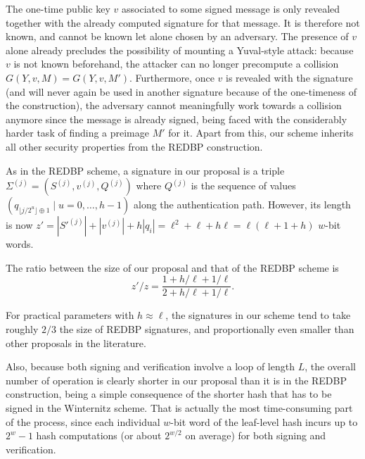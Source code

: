 \documentclass[11pt]{llncs}
\begin{document}
The one-time public key $v$ associated to some signed message is only revealed together with the already computed signature for that message. It is therefore not known, and cannot be known let alone chosen by an adversary.
The presence of $v$ alone already precludes the possibility of mounting a Yuval-style attack: because $v$ is not known beforehand, the attacker can no longer precompute a collision $G(Y, v, M) = G(Y, v, M')$. Furthermore, once $v$ is revealed with the signature (and will never again be used in another signature because of the one-timeness of the construction), the adversary cannot meaningfully work towards a collision anymore since the message is already signed, being faced with the considerably harder task of finding a preimage $M'$ for it. Apart from this, our scheme inherits all other security properties from the REDBP construction.

As in the REDBP scheme, a signature in our proposal is a triple $\Sigma^{(j)} = (S^{(j)}, v^{(j)}, Q^{(j)})$ where $Q^{(j)}$ is the sequence of values $(q_{\lfloor j/2^u \rfloor \oplus 1} \mid u = 0, \dots, h-1)$ along the authentication path. However, its length is now $z' = |S'^{(j)}| + |v^{(j)}| + h |q_i| = \ell^2 + \ell + h\ell = \ell(\ell + 1 + h)$ $w$-bit words.

The ratio between the size of our proposal and that of the REDBP scheme is
\[
z'/z = \dfrac{1 + h/\ell + 1/\ell}{2 + h/\ell + 1/\ell}.
\]

For practical parameters with $h \approx \ell$, the signatures in our scheme tend to take roughly $2/3$ the size of REDBP signatures, and proportionally even smaller than other proposals in the literature.

Also, because both signing and verification involve a loop of length $L$, the overall number of operation is clearly shorter in our proposal than it is in the REDBP construction, being a simple consequence of the shorter hash that has to be signed in the Winternitz scheme. That is actually the most time-consuming part of the process, since each individual $w$-bit word of the leaf-level hash incurs up to $2^w - 1$ hash computations (or about $2^{w/2}$ on average) for both signing and verification.

\end{document}
